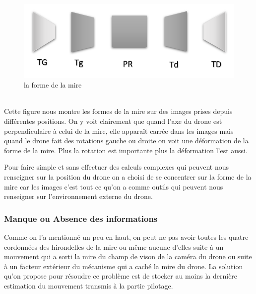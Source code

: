 \documentclass[12pt]{article}
\begin{document}
\setlength{\unitlength}{1cm}
    \begin{figure}[h!]
    \centering
    \includegraphics[scale=0.7]{ROTATION2.PNG}
    \caption{\label{forme de la mire}la forme de la mire}
    \end{figure}
     \\
    
Cette figure nous montre les formes de la mire sur des images prises depuis différentes positions. On y voit clairement que quand l'axe du drone est perpendiculaire à celui de la mire, elle apparaît carrée dans les images mais quand le drone fait des rotations  gauche ou droite on voit une déformation de la forme de la mire. Plus la rotation est importante plus la déformation l'est aussi. 


Pour faire simple et sans effectuer des calculs complexes qui peuvent nous renseigner sur la position du drone on a choisi de se concentrer sur la forme de la mire car les images c'est tout ce qu'on a comme outils qui peuvent nous renseigner sur l'environnement externe du drone.

\subsubsection{Manque ou Absence des informations}
Comme on l'a mentionné un peu en haut, on peut ne pas avoir toutes les quatre cordonnées des hirondelles de la mire ou même aucune d'elles suite à un mouvement qui a sorti la mire du champ de vison de la caméra du drone ou suite à un facteur extérieur du mécanisme qui a caché la mire du drone. La solution qu'on propose pour résoudre ce problème est de stocker au moins la dernière estimation du mouvement transmis à la partie pilotage.\\
\end{document}
